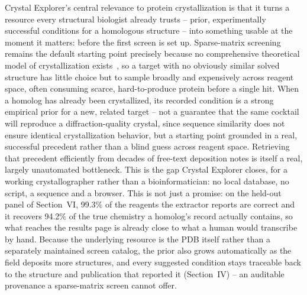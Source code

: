 Crystal Explorer's central relevance to protein crystallization is that
it turns a resource every structural biologist already trusts -- prior,
experimentally successful conditions for a homologous structure -- into
something usable at the moment it matters: before the first screen is
set up. Sparse-matrix screening~\cite{jancarik1991sparse} remains the default starting point
precisely because no comprehensive theoretical model of crystallization
exists~\cite{kwon2013modeling,mcphersoncudney2014optimization}, so a
target with no obviously similar solved structure has little choice but
to sample broadly and expensively across reagent space, often consuming
scarce, hard-to-produce protein before a single hit. When a homolog has
already been crystallized, its recorded condition is a strong empirical
prior for a new, related target -- not a guarantee that the same
cocktail will reproduce a diffraction-quality crystal, since sequence
similarity does not ensure identical crystallization behavior, but a
starting point grounded in a real, successful precedent rather than a
blind guess across reagent space. Retrieving that precedent efficiently
from decades of free-text deposition notes is itself a real, largely
unautomated bottleneck. This is the gap Crystal Explorer closes, for a working
crystallographer rather than a bioinformatician: no local database, no
script, a sequence and a browser. This is not just a promise: on the
held-out panel of Section~VI, 99.3\% of the reagents the extractor
reports are correct and it recovers 94.2\% of the true chemistry a
homolog's record actually contains, so what reaches the
results page is already close to what a human would transcribe by hand.
Because the underlying resource is the PDB itself rather than a
separately maintained screen catalog, the prior also grows automatically
as the field deposits more structures, and every suggested condition
stays traceable back to the structure and publication that reported it
(Section~IV) -- an auditable provenance a sparse-matrix screen cannot
offer.

